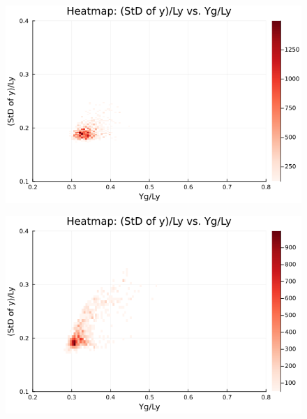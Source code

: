 \begin{figure}[H]
  \centering
  \includegraphics[scale=0.6]{image/RaRtmap_heat/2023-11-15T03:19:32.715__chi1.265_Ay50_rho0.4_T0.43_dT0.04_Rd0.0_Rt0.25_Ra0.0_g0.0003999718779659611_run4.0e7_output.png}
  \label{}
\end{figure}

\begin{figure}[H]
  \centering
  \includegraphics[scale=0.6]{image/RaRtmap_heat/2023-11-15T04:11:00.956__chi1.265_Ay50_rho0.4_T0.43_dT0.04_Rd0.0_Rt0.25_Ra0.4693845_g0.0003999718779659611_run4.0e7_output.png}
  \label{}
\end{figure}

